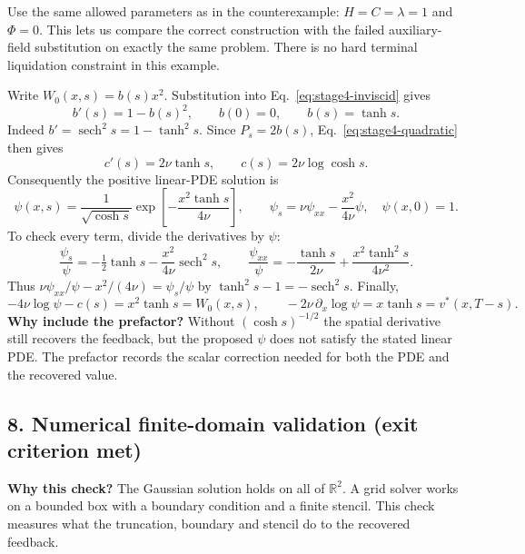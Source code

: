 Use the same allowed parameters as in the counterexample:
$H=C=\lambda=1$ and $\Phi=0$. This lets us compare the correct construction
with the failed auxiliary-field substitution on exactly the same problem.
There is no hard terminal liquidation constraint in this example.

Write $W_0(x,s)=b(s)x^2$. Substitution into
Eq.~\eqref{eq:stage4-inviscid} gives
\[
 b'(s)=1-b(s)^2,\qquad b(0)=0,\qquad b(s)=\tanh s.
\]
Indeed $b'=\operatorname{sech}^2s=1-\tanh^2s$. Since $P_s=2b(s)$,
Eq.~\eqref{eq:stage4-quadratic} then gives
\[
 c'(s)=2\nu\tanh s,\qquad
 c(s)=2\nu\log\cosh s.
\]
Consequently the positive linear-PDE solution is
\begin{equation}
 \boxed{\psi(x,s)=\frac{1}{\sqrt{\cosh s}}
 \exp\left[-\frac{x^2\tanh s}{4\nu}\right],\qquad
 \psi_s=\nu\psi_{xx}-\frac{x^2}{4\nu}\psi,\quad\psi(x,0)=1.}
 \label{eq:stage4-scalar-solution}
\end{equation}
To check every term, divide the derivatives by $\psi$:
\[
 \frac{\psi_s}{\psi}=-\tfrac12\tanh s
 -\frac{x^2}{4\nu}\operatorname{sech}^2s,\qquad
 \frac{\psi_{xx}}{\psi}=-\frac{\tanh s}{2\nu}
 +\frac{x^2\tanh^2s}{4\nu^2}.
\]
Thus $\nu\psi_{xx}/\psi-x^2/(4\nu)=\psi_s/\psi$ by
$\tanh^2s-1=-\operatorname{sech}^2s$. Finally,
\[
 -4\nu\log\psi-c(s)=x^2\tanh s=W_0(x,s),\qquad
 -2\nu\,\partial_x\log\psi=x\tanh s=v^*(x,T-s).
\]
\textbf{Why include the prefactor?} Without $(\cosh s)^{-1/2}$ the
spatial derivative still recovers the feedback, but the proposed $\psi$
does not satisfy the stated linear PDE. The prefactor records the scalar
correction needed for both the PDE and the recovered value.

\subsection*{8. Numerical finite-domain validation (exit criterion met)}

\textbf{Why this check?} The Gaussian solution holds on all of
$\mathbb R^2$. A grid solver works on a bounded box with a boundary
condition and a finite stencil. This check measures what the
truncation, boundary and stencil do to the recovered feedback.

